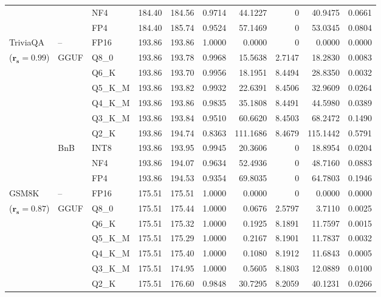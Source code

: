\begin{longtable}{ll l rrrrrrr}
 &  & NF4 & 184.40 & 184.56 & 0.9714 & 44.1227 & \cellcolor{cyan!12} $0$ & 40.9475 & 0.0661 \\
 &  & FP4 & 184.40 & 185.74 & 0.9524 & 57.1469 & \cellcolor{cyan!12} $0$ & 53.0345 & 0.0804 \\
\midrule
TriviaQA & -- & FP16 & 193.86 & 193.86 & 1.0000 & 0.0000 & \cellcolor{cyan!12} $0$ & 0.0000 & 0.0000 \\
{\small ($\mathbf{r_s{=}0.99}$)} & GGUF & Q8\_0 & 193.86 & 193.78 & 0.9968 & 15.5638 & 2.7147 & 18.2830 & 0.0083 \\
 &  & Q6\_K & 193.86 & 193.70 & 0.9956 & 18.1951 & 8.4494 & 28.8350 & 0.0032 \\
 &  & Q5\_K\_M & 193.86 & 193.82 & 0.9932 & 22.6391 & 8.4506 & 32.9609 & 0.0264 \\
 &  & Q4\_K\_M & 193.86 & 193.86 & 0.9835 & 35.1808 & 8.4491 & 44.5980 & 0.0389 \\
 &  & Q3\_K\_M & 193.86 & 193.84 & 0.9510 & 60.6620 & 8.4503 & 68.2472 & 0.1490 \\
 &  & Q2\_K & 193.86 & 194.74 & \cellcolor{red!18} 0.8363 & \cellcolor{red!18} 111.1686 & 8.4679 & \cellcolor{red!18} 115.1442 & \cellcolor{red!18} 0.5791 \\
 & BnB & INT8 & 193.86 & 193.95 & 0.9945 & 20.3606 & \cellcolor{cyan!12} $0$ & 18.8954 & 0.0204 \\
 &  & NF4 & 193.86 & 194.07 & 0.9634 & 52.4936 & \cellcolor{cyan!12} $0$ & 48.7160 & 0.0883 \\
 &  & FP4 & 193.86 & 194.53 & \cellcolor{red!18} 0.9354 & \cellcolor{red!18} 69.8035 & \cellcolor{cyan!12} $0$ & \cellcolor{red!18} 64.7803 & \cellcolor{red!18} 0.1946 \\
\midrule
GSM8K & -- & FP16 & 175.51 & 175.51 & 1.0000 & 0.0000 & \cellcolor{cyan!12} $0$ & 0.0000 & 0.0000 \\
{\small ($\mathbf{r_s{=}0.87}$)} & GGUF & Q8\_0 & 175.51 & 175.44 & 1.0000 & 0.0676 & 2.5797 & 3.7110 & 0.0025 \\
 &  & Q6\_K & 175.51 & 175.32 & 1.0000 & 0.1925 & 8.1891 & 11.7597 & 0.0015 \\
 &  & Q5\_K\_M & 175.51 & 175.29 & 1.0000 & 0.2167 & 8.1901 & 11.7837 & 0.0032 \\
 &  & Q4\_K\_M & 175.51 & 175.40 & 1.0000 & 0.1080 & 8.1912 & 11.6843 & 0.0005 \\
 &  & Q3\_K\_M & 175.51 & 174.95 & 1.0000 & 0.5605 & 8.1803 & 12.0889 & 0.0100 \\
 &  & Q2\_K & 175.51 & 176.60 & 0.9848 & 30.7295 & 8.2059 & 40.1231 & 0.0266 \\

\end{longtable}
